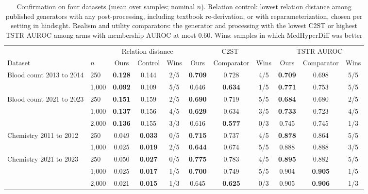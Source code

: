 \documentclass[conference]{IEEEtran}
\begin{document}
\begin{table}[t]
\caption{Confirmation on four datasets (mean over samples; nominal $n$). Relation control: lowest relation distance among published generators with any post-processing, including textbook re-derivation, or with reparameterization, chosen per setting in hindsight. Realism and utility comparators: the generator and processing with the lowest C2ST or highest TSTR AUROC among arms with membership AUROC at most 0.60. Wins: samples in which MedHyperDiff was better}
\label{tab:robust}
\centering
\setlength{\tabcolsep}{4pt}
\begin{tabular}{llccccccccc}
\toprule
& & \multicolumn{3}{c}{Relation distance} & \multicolumn{3}{c}{C2ST} & \multicolumn{3}{c}{TSTR AUROC} \\
Dataset & $n$ & Ours & Control & Wins & Ours & Comparator & Wins & Ours & Comparator & Wins \\
\midrule
Blood count 2013 to 2014 & 250 & \textbf{0.128} & 0.144 & 2/5 & \textbf{0.709} & 0.728 & 4/5 & \textbf{0.709} & 0.698 & 5/5 \\
& 1,000 & \textbf{0.092} & 0.109 & 5/5 & 0.646 & \textbf{0.634} & 1/5 & \textbf{0.771} & 0.753 & 5/5 \\
Blood count 2021 to 2023 & 250 & \textbf{0.151} & 0.159 & 2/5 & \textbf{0.690} & 0.719 & 5/5 & \textbf{0.684} & 0.680 & 2/5 \\
& 1,000 & \textbf{0.137} & 0.156 & 4/5 & \textbf{0.629} & 0.634 & 3/5 & \textbf{0.733} & 0.723 & 4/5 \\
& 2,000 & \textbf{0.136} & 0.155 & 3/3 & 0.616 & \textbf{0.577} & 0/3 & 0.745 & 0.745 & 1/3 \\
Chemistry 2011 to 2012 & 250 & 0.049 & \textbf{0.033} & 0/5 & \textbf{0.715} & 0.737 & 4/5 & \textbf{0.878} & 0.864 & 5/5 \\
& 1,000 & 0.025 & \textbf{0.019} & 2/5 & \textbf{0.644} & 0.674 & 5/5 & 0.888 & 0.888 & 3/5 \\
Chemistry 2021 to 2023 & 250 & 0.050 & \textbf{0.027} & 0/5 & \textbf{0.775} & 0.783 & 4/5 & \textbf{0.895} & 0.882 & 5/5 \\
& 1,000 & 0.025 & \textbf{0.017} & 1/5 & \textbf{0.700} & 0.749 & 5/5 & 0.904 & \textbf{0.905} & 1/5 \\
& 2,000 & 0.021 & \textbf{0.015} & 1/3 & 0.645 & \textbf{0.625} & 0/3 & 0.905 & \textbf{0.906} & 1/3 \\
\bottomrule
\end{tabular}
\end{table}
\end{document}
